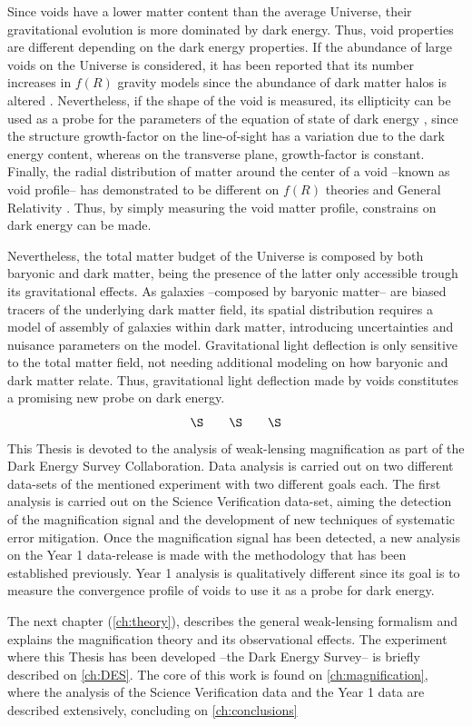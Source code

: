 Since voids have a lower matter content than the average Universe, their gravitational evolution is more dominated by dark energy. Thus, void properties are different depending on the dark energy properties. If the abundance of large voids on the Universe is considered, it has been reported that its number increases in $f(R)$ gravity models \cite{2012MNRAS.421.3481L} since the abundance of dark matter halos is altered \cite{2017JCAP...03..012V}. Nevertheless, if the shape of the void is measured, its ellipticity can be used as a probe for the parameters of the equation of state of dark energy \cite{2010MNRAS.403.1392L,0004-637X-754-2-109,PhysRevLett.98.081301,2013PhRvL.111x1103S}, since the structure growth-factor on the line-of-sight has a variation due to
the dark energy content, whereas on the transverse plane, growth-factor is constant. Finally, the radial distribution of matter around the center of a void --known as void profile-- has demonstrated to be different on $f(R)$ theories and General Relativity \cite{2014APh....54...44A,2014arXiv1410.8355C,2015MNRAS.451.4215Z,2015JCAP...08..028B,2016PhRvD..93j3522A,2016PhRvD..94j3524A}. Thus, by simply measuring the void matter profile, constrains on dark energy can be made.
\newline

Nevertheless, the total matter budget of the Universe is composed by both baryonic and dark matter, being the presence of the latter only accessible trough its gravitational effects. As galaxies --composed by baryonic matter-- are biased tracers of the underlying dark matter field, its spatial distribution requires a model of assembly of galaxies within dark matter, introducing uncertainties and nuisance parameters on the model. Gravitational light deflection is only sensitive to the total matter field, not needing additional modeling on how baryonic and dark matter relate. Thus, gravitational light deflection made by voids constitutes a promising new probe on dark energy.
$$\S\qquad \S\qquad \S$$
This Thesis is devoted to the analysis of weak-lensing magnification as part of the Dark Energy Survey Collaboration. Data analysis is carried out on two different data-sets of the mentioned experiment with two different goals each. The first analysis is carried out on the Science Verification data-set, aiming the detection of the magnification signal and the development of new techniques of systematic error mitigation. Once the magnification signal has been detected, a new analysis on the Year 1 data-release is made with the methodology that has been established previously. Year 1 analysis is qualitatively different since its goal is to measure the convergence profile of voids to use it as a probe for dark energy.
\newline

The next chapter (\autoref{ch:theory}), describes the general weak-lensing formalism and explains the magnification theory and its observational effects. The experiment where this Thesis has been developed --the Dark Energy Survey-- is briefly described on \autoref{ch:DES}. The core of this work is found on \autoref{ch:magnification}, where the analysis of the Science Verification data and the Year 1 data are described extensively, concluding on \autoref{ch:conclusions}

